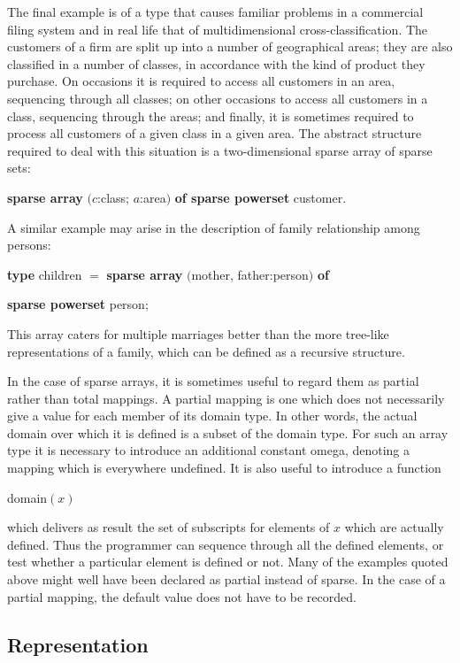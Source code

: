 The final example is of a type that causes familiar problems in a commercial filing system and in real life \textemdash{} that of multidimensional cross-classification. The customers of a firm are split up into a number of geographical areas; they are also classified in a number of classes, in accordance with the kind of product they purchase. On occasions it is required to access all customers in an area, sequencing through all classes; on other occasions to access all customers in a class, sequencing through the areas; and finally, it is sometimes required to process all customers of a given class in a given area. The abstract structure required to deal with this situation is a two-dimensional sparse array of sparse sets:

\quad \textbf{sparse array} $(c$:class; $a$:area$)$ \textbf{of sparse powerset} customer.

A similar example may arise in the description of family relationship among persons:

\quad \textbf{type} children $=$ \textbf{sparse array} $($mother, father:person$)$ \textbf{of} 

\tabto*{9.2em}\textbf{sparse powerset} person;

\noindent
This array caters for multiple marriages better than the more tree-like representations of a family, which can be defined as a recursive structure.

In the case of sparse arrays, it is sometimes useful to regard them as partial rather than total mappings. A partial mapping is one which does not necessarily give a value for each member of its domain type. In other words, the actual domain over which it is defined is a subset of the domain type. For such an array type it is necessary to introduce an additional constant omega, denoting a mapping which is everywhere undefined. It is also useful to introduce a function

\quad domain$(x)$

\noindent
which delivers as result the set of subscripts for elements of $x$ which are actually defined. Thus the programmer can sequence through all the defined elements, or test whether a particular element is defined or not. Many of the examples quoted above might well have been declared as partial instead of sparse. In the case of a partial mapping, the default value does not have to be recorded.

\subsection{Representation}

